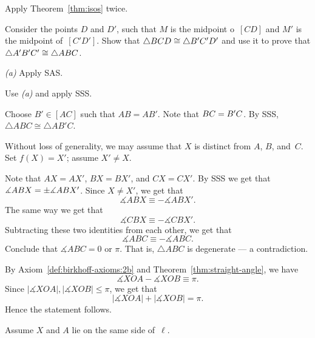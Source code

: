 \setcounter{eqtn}{0}

Apply Theorem~\ref{thm:isos} twice.

Consider the points $D$ and $D'$, such that 
$M$ is the midpoint o~$[CD]$
and 
$M'$ is the midpoint of~$[C'D']$.
Show that $\triangle BCD\z\cong \triangle B'C'D'$ and use it to prove that $\triangle A' B' C'\z\cong\triangle A B C$.

 \textit{(a)} Apply SAS.

 Use \textit{(a)} and apply SSS.

Choose $B'\in [AC]$ such that $AB=AB'$.
Note that $BC\z=B'C$.
By SSS, 
 $\triangle ABC\cong \triangle AB'C$.

Without loss of generality, we may assume that $X$ is distinct from $A$, $B$, and~$C$.
Set $f(X)=X'$; assume $X'\ne X$.

Note that $AX=AX'$, $BX=BX'$, and $CX=CX'$.
By SSS we get that $\measuredangle ABX\z=\pm\measuredangle ABX'$.
Since $X\ne X'$, we get that
$$\measuredangle ABX\equiv - \measuredangle ABX'.$$
The same way we get that 
$$\measuredangle CBX\equiv - \measuredangle CBX'.$$
Subtracting these two identities from each other, we get that
$$\measuredangle ABC\equiv -\measuredangle ABC.$$
Conclude that $\measuredangle ABC=0$ or $\pi$.
That is, $\triangle ABC$ is degenerate --- a contradiction. 

\setcounter{eqtn}{0}

By Axiom~\ref{def:birkhoff-axioms:2b} and Theorem~\ref{thm:straight-angle}, we have
\[\measuredangle XOA-\measuredangle XOB\equiv\pi.\]
Since $|\measuredangle XOA|,|\measuredangle XOB|\le \pi$, we get that
\[|\measuredangle XOA|+|\measuredangle XOB|=\pi.\]
Hence the statement follows. 

Assume $X$ and $A$ lie on the same side of~$\ell$.

